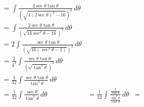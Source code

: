 \documentclass[preview]{standalone}
\begin{document}
\begin{align*}
&= \int \frac{2\sec\theta\tan\theta}{(\sqrt{4(2\sec\theta)^2-16})^3} \, d\theta \\ &=\int \frac{2\sec\theta\tan\theta}{(\sqrt{16\sec^2\theta-16})^3} \, d\theta \\ &=2\int \frac{\sec\theta\tan\theta}{(\sqrt{16(\sec^2\theta-1)})^3} \, d\theta \\ &=\frac{2}{4^3} \int \frac{\sec\theta\tan\theta}{(\sqrt{\tan^2\theta})^3} \, d\theta \\ &=\frac{1}{32} \int \frac{\sec\theta\tan\theta}{\tan^3\theta} \, d\theta \\ &=\frac{1}{32} \int \frac{\sec\theta}{\tan^2\theta }\, d\theta&=\frac{1}{32} \int \frac{\frac{1}{\cos\theta}}{\frac{\sin^2\theta}{\cos^2\theta}} \, d\theta&=
\end{align*}
\end{document}
